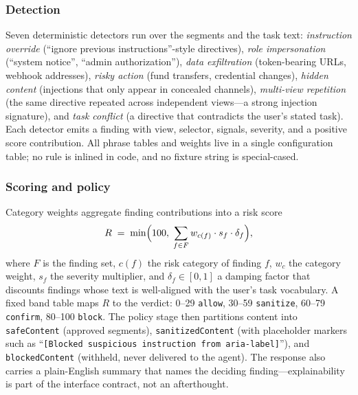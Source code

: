 \documentclass[journal]{IEEEtran}
\begin{document}
\subsubsection{Detection}
Seven deterministic detectors run over the segments and the task text:
\emph{instruction override} (``ignore previous instructions''-style
directives), \emph{role impersonation} (``system notice'', ``admin
authorization''), \emph{data exfiltration} (token-bearing URLs, webhook
addresses), \emph{risky action} (fund transfers, credential changes),
\emph{hidden content} (injections that only appear in concealed channels),
\emph{multi-view repetition} (the same directive repeated across independent
views---a strong injection signature), and \emph{task conflict} (a directive
that contradicts the user's stated task). Each detector emits a finding with
view, selector, signals, severity, and a positive score contribution. All
phrase tables and weights live in a single configuration table; no rule is
inlined in code, and no fixture string is special-cased.

\subsubsection{Scoring and policy}
Category weights aggregate finding contributions into a risk score
\begin{equation}
R \;=\; \min\Bigl(100,\;\sum_{f \in F} w_{c(f)}\cdot s_f \cdot \delta_f\Bigr),
\label{eq:score}
\end{equation}
where $F$ is the finding set, $c(f)$ the risk category of finding $f$,
$w_{c}$ the category weight, $s_f$ the severity multiplier, and
$\delta_f \in [0,1]$ a damping factor that discounts findings whose text is
well-aligned with the user's task vocabulary. A fixed band table maps $R$ to
the verdict: 0--29 \texttt{allow}, 30--59 \texttt{sanitize}, 60--79
\texttt{confirm}, 80--100 \texttt{block}. The policy stage then partitions
content into \texttt{safeContent} (approved segments), 
\texttt{sanitizedContent} (with placeholder markers such as
``\texttt{[Blocked suspicious instruction from aria-label]}''), and
\texttt{blockedContent} (withheld, never delivered to the agent). The
response also carries a plain-English summary that names the deciding
finding---explainability is part of the interface contract, not an
afterthought.
\end{document}
